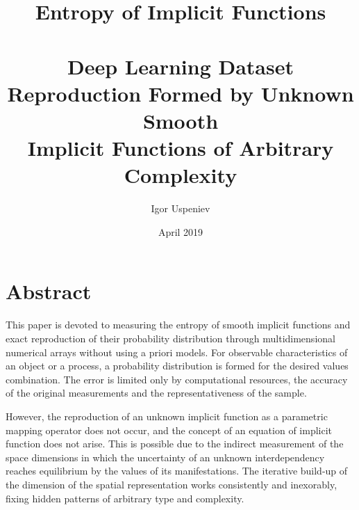 \documentclass[a4paper, 11pt, oneside]{book}
\author{Igor Uspeniev}
\title{%
	Entropy of Implicit Functions \\~\\
	\large Deep Learning Dataset Reproduction Formed by Unknown Smooth \\
	Implicit Functions of Arbitrary Complexity}
\date{April 2019}
\begin{document}
	
\maketitle

\tableofcontents
\thispagestyle{empty} 
      
\chapter*{Abstract}
\thispagestyle{empty}
This paper is devoted to measuring the entropy of smooth implicit functions and exact reproduction of their probability distribution through multidimensional numerical arrays without using a priori models. For observable characteristics of an object or a process, a probability distribution is formed for the desired values combination. The error is limited only by computational resources, the accuracy of the original measurements and the representativeness of the sample.

However, the reproduction of an unknown implicit function as a parametric mapping operator does not occur, and the concept of an equation of implicit function does not arise. This is possible due to the indirect measurement of the space dimensions in which the uncertainty of an unknown interdependency reaches equilibrium by the values of its manifestations. The iterative build-up of the dimension of the spatial representation works consistently and inexorably, fixing hidden patterns of arbitrary type and complexity.
\afterpage{\cfoot{\thepage}}

\end{document}
